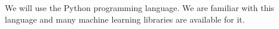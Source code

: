 We will use the Python programming language. We are familiar with this language
and many machine learning libraries are available for it.
